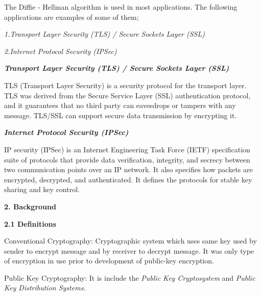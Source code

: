 \documentclass{article}
\begin{document}
\begin{flushleft}
\hspace{0.5cm} The Diffie - Hellman algorithm is used in most applications. The following applications are examples of some of them; \newline

\hspace{1cm} \textit{1.Transport Layer Security (TLS) / Secure Sockets Layer (SSL)}

\hspace{1cm} \textit{2.Internet Protocol Security (IPSec)} \newline

\textit{\textbf{Transport Layer Security (TLS) / Secure Sockets Layer (SSL)}}

\hspace{0.5cm} TLS (Transport Layer Security) is a security protocol for the transport layer. TLS was derived from the Secure Service Layer (SSL) authentication protocol, and it guarantees that no third party can eavesdrops or tampers with any message. TLS/SSL can support secure data transmission by encrypting it.
\vspace{5mm}

\textit{\textbf{Internet Protocol Security (IPSec)}}

\hspace{0.5cm} IP security (IPSec) is an Internet Engineering Task Force (IETF) specification suite of protocols that provide data verification, integrity, and secrecy between two communication points over an IP network. It also specifies how packets are encrypted, decrypted, and authenticated. It defines the protocols for stable key sharing and key control.
\vspace{5mm}


\textbf{2. Background} \newline

\textbf{2.1 Definitions} \newline

\hspace{0.5cm} Conventional Cryptography: Cryptographic system which uses same key used by sender to encrypt message and by receiver to decrypt message. It was only type of encryption in use prior to development of public-key encryption. \newline

\hspace{0.5cm} Public Key Cryptography: It is include the \textit{Public Key Cryptosystem} and \textit{Public Key Distribution Systems.} \newline


\end{flushleft}
\end{document}
